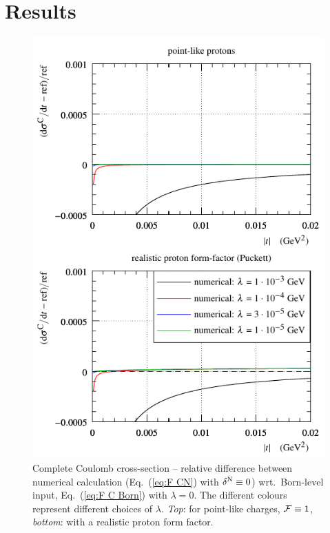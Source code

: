 \documentclass{appolb}
\begin{document}

\section{Results}
\label{sec:results}

\begin{figure}[h]
\begin{center}
\includegraphics{fig/coul_complete_cmp_lambda_dsdt.pdf}
\caption{Complete Coulomb cross-section -- relative difference between numerical calculation (Eq.~(\ref{eq:F CN}) with $\delta^{\rm N} \equiv 0$) wrt.~Born-level input, Eq.~(\ref{eq:F C Born}) with $\lambda = 0$. The different colours represent different choices of $\lambda$. {\it Top}: for point-like charges, ${\cal F} \equiv 1$, {\it bottom}: with a realistic proton form factor.}
\label{f:sig C}
\end{center}
\end{figure}
\end{document}
